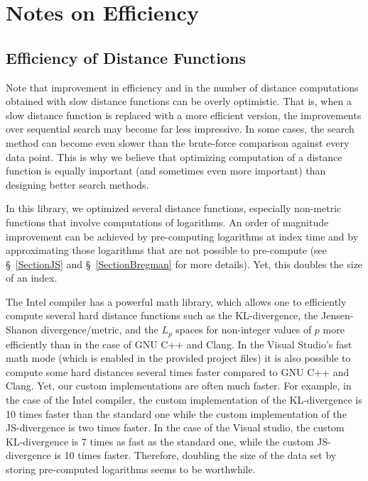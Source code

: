 \documentclass[runningheads,a4paper]{llncs}
\begin{document}
\section{Notes on Efficiency}\label{SectionEfficiency}

\subsection{Efficiency of Distance Functions}
Note that improvement in efficiency and in the number of distance computations
obtained with slow distance functions can be overly optimistic.
That is, when a slow distance function is replaced with a more efficient version,
the improvements over sequential search may become far less impressive.
In some cases, the search method can become even slower than the brute-force
comparison against every data point.
This is why we believe that optimizing  computation of a distance function 
is equally important (and sometimes even more important) 
than designing better search methods.

In this library, we optimized several distance functions, 
especially non-metric functions that involve computations of logarithms.
An order of magnitude improvement can be achieved by pre-computing 
logarithms at index time and by approximating those logarithms that are not possible
to pre-compute (see \S~\ref{SectionJS} and \S~\ref{SectionBregman} for more details).
Yet, this doubles the size of an index.

The Intel compiler has a powerful math library, 
which allows one to efficiently compute several hard distance functions
such as the KL-divergence, the Jensen-Shanon divergence/metric, and
the $L_p$ spaces for non-integer values of $p$ more efficiently than in the case of GNU C++
and Clang.
In the Visual Studio's fast math mode (which is enabled in the provided project files)
it is also possible to compute some hard distances several times faster compared to GNU C++ and Clang.
Yet, our custom implementations are often much faster.
For example, in the case of the Intel compiler,
the custom implementation of the KL-divergence is 10 times faster 
than the standard one while
the custom implementation of the JS-divergence is two times faster.
In the case of the Visual studio, the custom KL-divergence is 
7 times as fast as the standard one, while the custom JS-divergence is 10 times faster.
Therefore,
doubling the size of the data set by storing pre-computed logarithms seems to be worthwhile.
\end{document}
